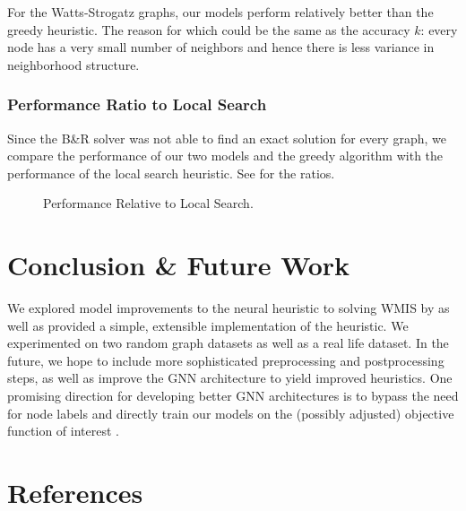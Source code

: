 \documentclass{article}
\begin{document}
For the Watts-Strogatz graphs,
our models perform relatively better than the greedy heuristic.
The reason for which could be the same as the accuracy $k$:
every node has a very small number of neighbors
and hence there is less variance in neighborhood structure.

\subsubsection{Performance Ratio to Local Search}
Since the B\&R solver was not able to find an exact solution for every graph,
we compare the performance of our two models and the greedy algorithm
with the performance of the local search heuristic.
See  for the ratios.

\begin{figure}
     \centering
     \caption{Performance Relative to Local Search.}
     \label{fig:local_search}
\end{figure}

\section{Conclusion \& Future Work}\label{sec:conclusion}
We explored model improvements to the neural heuristic to solving WMIS by \citet{langedal_et_al}
as well as provided a simple,
extensible implementation of the heuristic.
We experimented on two random graph datasets
as well as a real life dataset.
In the future,
we hope to include more sophisticated preprocessing and postprocessing steps,
as well as improve the GNN architecture to yield improved heuristics.
One promising direction for developing better GNN architectures
is to bypass the need for node labels
and directly train our models on the (possibly adjusted) objective function of interest \citet{karalias2022neural}.

\section{References}


\end{document}
